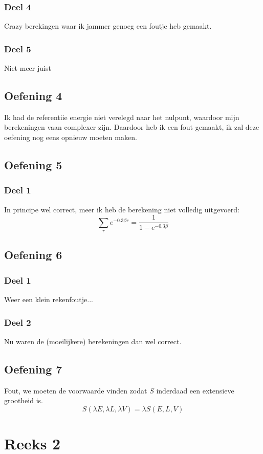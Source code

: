 \documentclass[a4paper,twoside]{article}
\theoremstyle{definition}
\theoremstyle{plain}
\begin{document}
\subsubsection{Deel 4}
Crazy berekingen waar ik jammer genoeg een foutje heb gemaakt.
\subsubsection{Deel 5}
Niet meer juist
\subsection{Oefening 4}
Ik had de referentiie energie niet verelegd naar het nulpunt, waardoor mijn berekeningen vaan complexer zijn.
Daardoor heb ik een fout gemaakt, ik zal deze oefening nog eens opnieuw moeten maken.
\subsection{Oefening 5}
\subsubsection{Deel 1}
In principe wel correct, meer ik heb de berekening niet volledig uitgevoerd:
\[
\sum_{r} e^{-0.3\beta r  } = \frac{1}{1 - e^{-0.3\beta}}
\]
\subsection{Oefening 6}
\subsubsection{Deel 1}
Weer een klein rekenfoutje...
\subsubsection{Deel 2}
Nu waren de (moeilijkere) berekeningen dan wel correct.
\subsection{Oefening 7}
Fout, we moeten de voorwaarde vinden zodat \(S\) inderdaad een extensieve grootheid is.
\[
S(\lambda E , \lambda L, \lambda V) = \lambda S(E, L, V)
\]
\section{Reeks 2}
\end{document}

